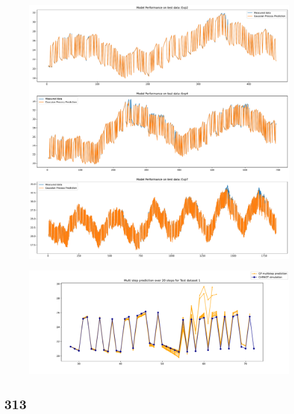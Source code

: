 \begin{figure}[ht]
    \centering
    \includegraphics[width = \textwidth]{Plots/GP_213_test_performance.pdf}
    \caption{}
    \label{fig:GP_213_test_validation}
\end{figure}


\begin{figure}[ht]
    \centering
    \includegraphics[width =
    \textwidth]{Plots/GP_213_-1pts_test_prediction_20_steps.pdf}
    \caption{}
    \label{fig:GP_213_multistep_validation}
\end{figure}


\clearpage

\subsection{313}


